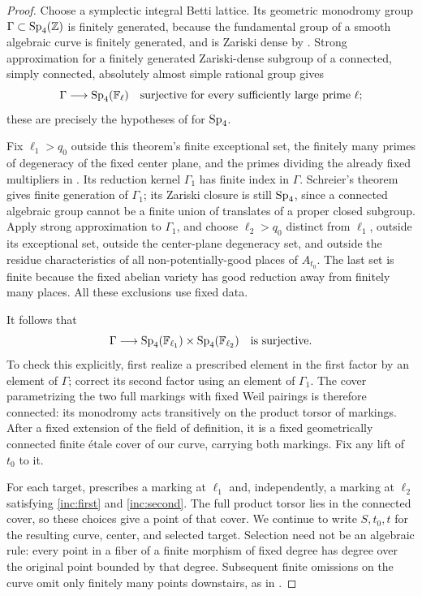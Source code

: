 \begin{proof}
Choose a symplectic integral Betti lattice.  Its geometric monodromy
group $\Gamma\subset\operatorname{Sp}_4(\mathbb Z)$ is finitely generated, because the
fundamental group of a smooth algebraic curve is finitely generated,
and is Zariski dense by .  Strong approximation
for a finitely generated Zariski-dense subgroup of a connected,
simply connected, absolutely almost simple rational group gives
\[
 \Gamma\longrightarrow\operatorname{Sp}_4(\mathbb F_\ell)
 \quad\hbox{surjective for every sufficiently large prime }\ell;
\]
these are precisely the hypotheses of
\cite[Introduction, Theorem, p.~515]{MVW1984} for $\operatorname{Sp}_4$.

Fix $\ell_1>q_0$ outside this theorem's finite exceptional set,
the finitely many primes of degeneracy of the fixed center plane,
and the primes dividing the already fixed multipliers in
.  Its reduction kernel
$\Gamma_1$ has finite index in $\Gamma$.  Schreier's theorem gives
finite generation of $\Gamma_1$; its Zariski closure is still
$\operatorname{Sp}_4$, since a connected algebraic group cannot be a finite union
of translates of a proper closed subgroup.  Apply strong approximation
to $\Gamma_1$, and choose $\ell_2>q_0$ distinct from $\ell_1$,
outside its exceptional set, outside the center-plane degeneracy set,
and outside the residue characteristics of all non-potentially-good
places of $A_{t_0}$.  The last set is finite because the fixed abelian
variety has good reduction away from finitely many places.  All these
exclusions use fixed data.

It follows that
\begin{equation}\label{inc:product-reduction}
 \Gamma\longrightarrow
 \operatorname{Sp}_4(\mathbb F_{\ell_1})\times\operatorname{Sp}_4(\mathbb F_{\ell_2})
 \quad\hbox{is surjective}.
\end{equation}
To check this explicitly, first realize a prescribed element in the
first factor by an element of $\Gamma$; correct its second factor
using an element of $\Gamma_1$.  The cover parametrizing the two
full markings with fixed Weil pairings is therefore connected:
its monodromy acts transitively on the product torsor of markings.
After a fixed extension of the field of definition, it is a fixed
geometrically connected finite \'etale cover of our curve, carrying
both markings.  Fix any lift of $t_0$ to it.

For each target,  prescribes a marking at
$\ell_1$ and, independently, a marking at $\ell_2$ satisfying
\eqref{inc:first} and \eqref{inc:second}.  The full product torsor
lies in the connected cover, so these choices give a point of that
cover.  We continue to write $S,t_0,t$ for the resulting curve,
center, and selected target.  Selection need not be an algebraic rule:
every point in a fiber of a finite morphism of fixed degree has degree
over the original point bounded by that degree.  Subsequent finite
omissions on the curve omit only finitely many points downstairs, as
in .


\end{proof}
